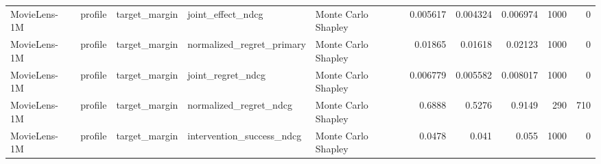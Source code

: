 \begin{table}[t]
\begin{tabular}{lllllrrrrr}
MovieLens-1M & profile & target\_margin & joint\_effect\_ndcg & Monte Carlo Shapley & 0.005617 & 0.004324 & 0.006974 & 1000 & 0 \\
MovieLens-1M & profile & target\_margin & normalized\_regret\_primary & Monte Carlo Shapley & 0.01865 & 0.01618 & 0.02123 & 1000 & 0 \\
MovieLens-1M & profile & target\_margin & joint\_regret\_ndcg & Monte Carlo Shapley & 0.006779 & 0.005582 & 0.008017 & 1000 & 0 \\
MovieLens-1M & profile & target\_margin & normalized\_regret\_ndcg & Monte Carlo Shapley & 0.6888 & 0.5276 & 0.9149 & 290 & 710 \\
MovieLens-1M & profile & target\_margin & intervention\_success\_ndcg & Monte Carlo Shapley & 0.0478 & 0.041 & 0.055 & 1000 & 0 \\
\bottomrule
\end{tabular}
\end{table}
